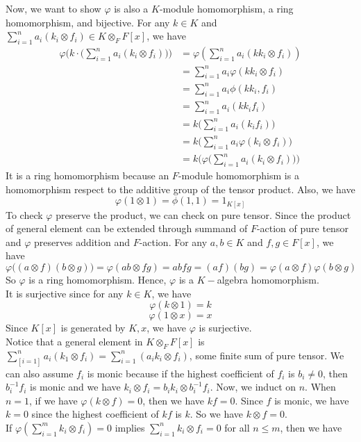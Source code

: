 \documentclass[12pt]{amsart}
\begin{document}
Now, we want to show $\varphi$ is also a $K$-module homomorphism, a ring homomorphism, and bijective. For any $k\in K$ and $\sum_{i=1}^na_i(k_i\otimes f_i)\in K\otimes_F F[x]$, we have 
\begin{align*}
    \varphi\bigg(k\cdot \big(\sum_{i=1}^na_i(k_i\otimes f_i)\big)\bigg)&=\varphi(\sum_{i=1}^na_i(kk_i\otimes f_i))\\
    &=\sum_{i=1}^na_i\varphi(kk_i\otimes f_i) \tag*{(as $F$-module homomorphism)}\\
    &=\sum_{i=1}^na_i\phi(kk_i,f_i) \tag*{(by the diagram)}\\
    &=\sum_{i=1}^na_i(kk_if_i)\\
    &=k\bigg(\sum_{i=1}^na_i(k_if_i)\bigg)\\
    &=k\bigg(\sum_{i=1}^na_i\varphi(k_i\otimes f_i)\bigg)\\
    &=k\bigg(\varphi\big(\sum_{i=1}^na_i(k_i\otimes f_i)\big)\bigg)
\end{align*}
It is a ring homomorphism because an $F$-module homomorphism is a homomorphism respect to the additive group of the tensor product. Also, we have 
\[\varphi(1\otimes 1)=\phi(1,1)=1_{K[x]}\]
To check $\varphi$ preserve the product, we can check on pure tensor. Since the product of general element can be extended through summand of $F$-action of pure tensor and $\varphi$ preserves addition and $F$-action. For any $a,b\in K$ and $f,g\in F[x]$, we have
\[\varphi\bigg((a\otimes f)(b\otimes g)\bigg)=\varphi(ab\otimes fg)=abfg=(af)(bg)=\varphi(a\otimes f)\varphi(b\otimes g)\]
So $\varphi$ is a ring homomorphism. Hence, $\varphi$ is a $K-$algebra homomorphism.\\
It is surjective since for any $k\in K$, we have 
\[\varphi(k\otimes 1)=k\]
\[\varphi(1\otimes x)=x\]
Since $K[x]$ is generated by $K,x$, we have $\varphi$ is surjective.\\
Notice that a general element in $K\otimes_F F[x]$ is $\sum_[i=1]^na_i(k_1\otimes f_i)=\sum_{i=1}^n(a_ik_i\otimes f_i)$, some finite sum of pure tensor. We can also assume $f_i$ is monic because if the highest coefficient of $f_i$ is $b_i\neq 0$, then $b_i^{-1}f_i$ is monic and 
we have $k_i\otimes f_i=b_ik_i\otimes b_i^{-1}f_i$. Now, we induct on $n$. When $n=1$, if we have $\varphi(k\otimes f)=0$, then we have $kf=0$. Since $f$ is monic, we have $k=0$ since the highest coefficient of $kf$ is $k$. So we have $k\otimes f=0$.\\
If $\varphi(\sum_{i=1}^mk_i\otimes f_i)=0$ implies $\sum_{i=1}^nk_i\otimes f_i=0$ for all $n\leq m$, then we have 
\end{document}
